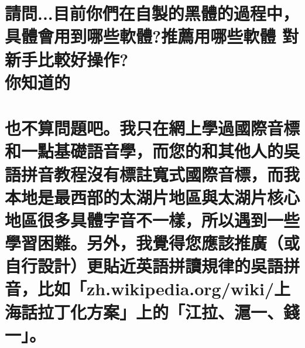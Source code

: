 \chapter[請問...目前你們在自製的黑體的過程中， 具體會用到哪些軟體?推薦用哪些軟體 對新手比較好操作? 你知道的]{請問...目前你們在自製的黑體的過程中， \\[0.35em] 具體會用到哪些軟體?推薦用哪些軟體 對新手比較好操作? \\[0.35em] 你知道的}

\chapter[也不算問題吧。我只在網上學過國際音標和一點基礎語音學，而您的和其他人的吳語拼音教程沒有標註寬式國際音標，而我本地是最西部的太湖片地區與太湖片核心地區很多具體字音不一樣，所以遇到一些學習困難。另外，我覺得您應該推廣（或自行設計）更貼近英語拼讀規律的吳語拼音，比如「zh.wikipedia.org/wiki/上海話拉丁化方案」上的「江拉、滬一、錢一」。]{也不算問題吧。我只在網上學過國際音標和一點基礎語音學，而您的和其他人的吳語拼音教程沒有標註寬式國際音標，而我本地是最西部的太湖片地區與太湖片核心地區很多具體字音不一樣，所以遇到一些學習困難。另外，我覺得您應該推廣（或自行設計）更貼近英語拼讀規律的吳語拼音，比如「zh.wikipedia.org/wiki/上海話拉丁化方案」上的「江拉、滬一、錢一」。}

